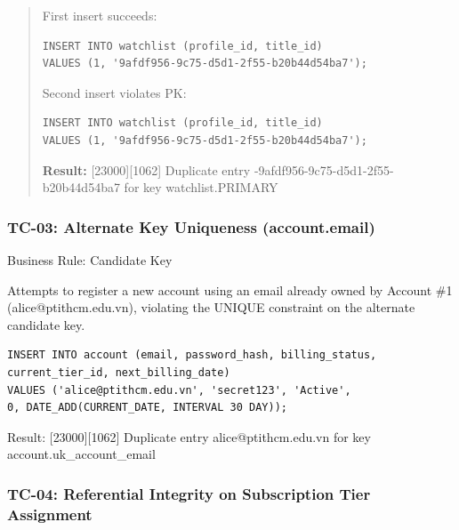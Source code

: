 \begin{quote}
\textbullet{} First insert succeeds:

\begin{lstlisting}[style=reportsql,title={Verification SQL}]
INSERT INTO watchlist (profile_id, title_id)
VALUES (1, '9afdf956-9c75-d5d1-2f55-b20b44d54ba7');
\end{lstlisting}



\textbullet{} Second insert violates PK:

\begin{lstlisting}[style=reportsql,title={Verification SQL}]
INSERT INTO watchlist (profile_id, title_id)
VALUES (1, '9afdf956-9c75-d5d1-2f55-b20b44d54ba7');
\end{lstlisting}



\textbullet{}\textbf{ Result:} {[}23000{]}{[}1062{]} Duplicate entry -9afdf956-9c75-d5d1-2f55-b20b44d54ba7\textquotesingle{} for key \textquotesingle watchlist.PRIMARY\textquotesingle{}
\end{quote}

\subsubsection{\texorpdfstring{\textbullet{} \textbf{TC-03: Alternate Key Uniqueness (account.email)}}{\textbullet{} TC-03: Alternate Key Uniqueness (account.email)}}\label{tc-03-alternate-key-uniqueness-account.email}

Business Rule: Candidate Key

Attempts to register a new account using an email already owned by Account \#1 (alice@ptithcm.edu.vn), violating the UNIQUE constraint on the alternate candidate key.

\begin{lstlisting}[style=reportsql,title={Verification SQL}]
INSERT INTO account (email, password_hash, billing_status,
current_tier_id, next_billing_date)
VALUES ('alice@ptithcm.edu.vn', 'secret123', 'Active',
0, DATE_ADD(CURRENT_DATE, INTERVAL 30 DAY));
\end{lstlisting}



\textbullet{} Result: {[}23000{]}{[}1062{]} Duplicate entry \textquotesingle alice@ptithcm.edu.vn\textquotesingle{} for key \textquotesingle account.uk\_\allowbreak{}account\_\allowbreak{}email\textquotesingle{}

\subsubsection{\texorpdfstring{\textbullet{} \textbf{TC-04: Referential Integrity on Subscription Tier Assignment}}{\textbullet{} TC-04: Referential Integrity on Subscription Tier Assignment}}\label{tc-04-referential-integrity-on-subscription-tier-assignment}

